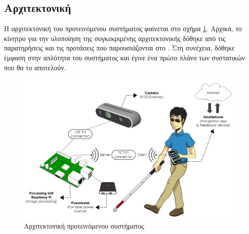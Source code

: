 \subsection{Αρχιτεκτονική}
Η αρχιτεκτονική του προτεινόμενου συστήματος φαίνεται στο σχήμα \ref{fig:architecture}. Αρχικά, το κίνητρο για την υλοποίηση της συγκεκριμένης αρχιτεκτονικής δόθηκε από τις παρατηρήσεις και τις προτάσεις που παρουσιάζονται στο \cite{angin2011real}. Στη συνέχεια, δόθηκε έμφαση στην απλότητα του συστήματος και έγινε ένα πρώτο πλάνο των συστατικών που θα το αποτελούν.
\begin{figure}[H]
    \centering
    \includegraphics[width=\textwidth]{images/architecture.png}
    \caption{Αρχιτεκτονική προτεινόμενου συστήματος}
    \label{fig:architecture}
\end{figure}

